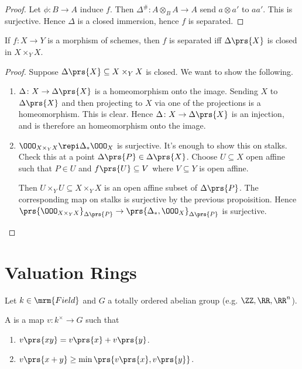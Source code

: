 \documentclass[10pt,a4paper,twoside,openany,hidelinks]{book}
\begin{document}
\begin{proof}
Let $\phi \colon B \to A$ induce $f$. Then $\Delta^{\#} \colon A \otimes_B A \to A$ send $a \otimes a'$ to $a a'$.
This is surjective.
Hence $\Delta$ is a closed immersion, hence $f$ is separated.
\end{proof}

\begin{corollary}
If $f \colon X \to Y$ is a morphism of schemes, then $f$ is separated iff $\Delta\prs{X}$ is closed in $X \times_Y X$.
\end{corollary}

\begin{proof}
Suppose $\Delta\prs{X} \subseteq X \times_Y X$ is closed.
We want to show the following.
\begin{enumerate}
    \item $\Delta \colon X \to \Delta\prs{X}$ is a homeomorphism onto the image.
    Sending $X$ to $\Delta\prs{X}$ and then projecting to $X$ via one of the projections is a homeomorphism. This is clear. Hence $\Delta \colon X \to \Delta\prs{X}$ is an injection, and is therefore an homeomorphism onto the image.
    \item $\OOO_{X \times_Y X} \repi \Delta_*\OOO_X$ is surjective. It's enough to show this on stalks. Check this at a point $\Delta\prs{P} \in \Delta\prs{X}$. Choose $U \subseteq X$ open affine such that $P \in U$ and $f\prs{U} \subseteq V$ where $V \subseteq Y$ is open affine.
    
    Then $U \times_Y U \subseteq X \times_Y X$ is an open affine subset of $\Delta\prs{P}$.
    The corresponding map on stalks is surjective by the previous propoisition.
    Hence $\prs{\OOO_{X \times_Y X}}_{\Delta\prs{P}} \to \prs{\Delta_*, \OOO_X}_{\Delta\prs{P}}$ is surjective.
\end{enumerate}
\end{proof}

\section{Valuation Rings}

Let $k \in \mrm{Field}$ and $G$ a totally ordered abelian group (e.g. $\ZZ, \RR, \RR^n$).

\begin{definition}[Valuation]
A  is a map $v \colon k^\times \to G$ such that
\begin{enumerate}
    \item $v\prs{xy} = v\prs{x} + v\prs{y}$.
    \item $v\prs{x+y} \geq \min\prs{v\prs{x}, v\prs{y}}$.
\end{enumerate}
\end{definition}
\end{document}
